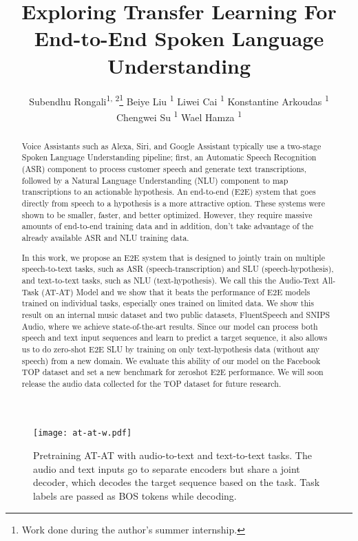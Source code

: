 \documentclass[letterpaper]{article} \usepackage{aaai21}  \usepackage{times}  \usepackage{helvet} \usepackage{courier}  \usepackage[hyphens]{url}  \usepackage{graphicx} \usepackage{booktabs}
\title{Exploring Transfer Learning For End-to-End Spoken Language Understanding}
\author {


        Subendhu Rongali\textsuperscript{\rm 1, 2}\thanks{Work done during the author's summer internship.}
        Beiye Liu \textsuperscript{\rm 1}
        Liwei Cai \textsuperscript{\rm 1}
        Konstantine Arkoudas \textsuperscript{\rm 1} \\
        Chengwei Su \textsuperscript{\rm 1}
        Wael Hamza \textsuperscript{\rm 1} \\
}
\begin{document}
\maketitle

\begin{abstract}
Voice Assistants such as Alexa, Siri, and Google Assistant typically use a two-stage Spoken Language Understanding pipeline; first, an Automatic Speech Recognition (ASR) component to process customer speech and generate text transcriptions, followed by a Natural Language Understanding (NLU) component to map transcriptions to an actionable hypothesis. An end-to-end (E2E) system that goes directly from speech to a hypothesis is a more attractive option. These systems were shown to be smaller, faster, and better optimized. However, they require massive amounts of end-to-end training data and in addition, don't take advantage of the already available ASR and NLU training data.

In this work, we propose an E2E system that is designed to jointly train on multiple speech-to-text tasks, such as ASR (speech-transcription) and SLU (speech-hypothesis), and text-to-text tasks, such as NLU (text-hypothesis). We call this the Audio-Text All-Task (AT-AT) Model and we show that it beats the performance of E2E models trained on individual tasks, especially ones trained on limited data. We show this result on an internal music dataset and two public datasets, FluentSpeech and SNIPS Audio, where we achieve state-of-the-art results. Since our model can process both speech and text input sequences and learn to predict a target sequence, it also allows us to do zero-shot E2E SLU by training on only text-hypothesis data (without any speech) from a new domain. We evaluate this ability of our model on the Facebook TOP dataset and set a new benchmark for zeroshot E2E performance. We will soon release the audio data collected for the TOP dataset for future research.

\end{abstract}

\begin{figure*}[t]
\centering
\hspace*{2.5em}\texttt{[image: at-at-w.pdf]}
\caption{Pretraining AT-AT with audio-to-text and text-to-text tasks. The audio and text inputs go to separate encoders but share a joint decoder, which decodes the target sequence based on the task. Task labels are passed as BOS tokens while decoding.}
\label{at-at-w}
\end{figure*}
\end{document}
